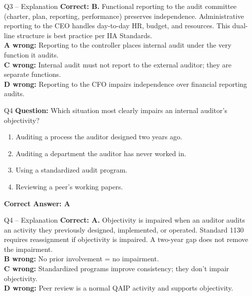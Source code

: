 \documentclass[aspectratio=169,10pt]{beamer}
\begin{document}
	\begin{frame}[t]{Q3 -- Explanation}
		\small
		\textbf{Correct: B.} Functional reporting to the audit committee (charter, plan, reporting, performance) preserves independence. Administrative reporting to the CEO handles day-to-day HR, budget, and resources. This dual-line structure is best practice per IIA Standards. \\[4pt]
		\textbf{A wrong:} Reporting to the controller places internal audit under the very function it audits. \\[2pt]
		\textbf{C wrong:} Internal audit must not report to the external auditor; they are separate functions. \\[2pt]
		\textbf{D wrong:} Reporting to the CFO impairs independence over financial reporting audits.
	\end{frame}
	
	\begin{frame}[t]{Q4}
		\small
		\textbf{Question:} Which situation most clearly impairs an internal auditor's objectivity?
		\begin{enumerate}[label=\Alph*.,itemsep=1pt,topsep=2pt]
			\item Auditing a process the auditor designed two years ago.
			\item Auditing a department the auditor has never worked in.
			\item Using a standardized audit program.
			\item Reviewing a peer's working papers.
		\end{enumerate}
		\vspace{4pt}
		\textbf{Correct Answer: A}
	\end{frame}
	
	\begin{frame}[t]{Q4 -- Explanation}
		\small
		\textbf{Correct: A.} Objectivity is impaired when an auditor audits an activity they previously designed, implemented, or operated. Standard 1130 requires reassignment if objectivity is impaired. A two-year gap does not remove the impairment. \\[4pt]
		\textbf{B wrong:} No prior involvement = no impairment. \\[2pt]
		\textbf{C wrong:} Standardized programs improve consistency; they don't impair objectivity. \\[2pt]
		\textbf{D wrong:} Peer review is a normal QAIP activity and supports objectivity.
	\end{frame}
	
\end{document}
